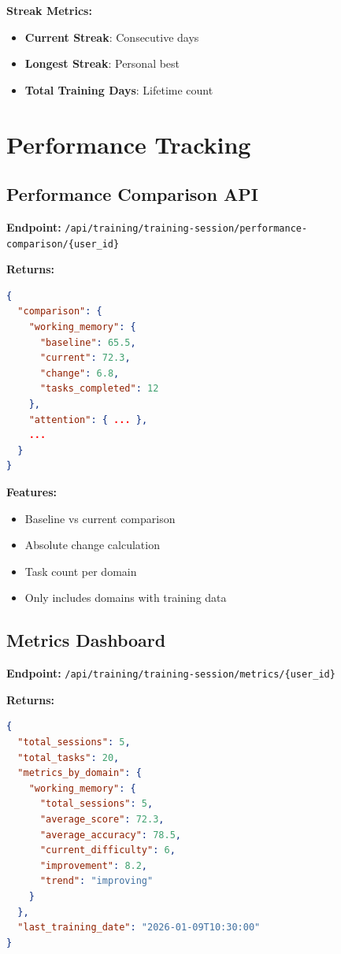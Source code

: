 \documentclass[12pt,a4paper]{article}
\begin{document}
\textbf{Streak Metrics:}
\begin{itemize}
    \item \textbf{Current Streak}: Consecutive days
    \item \textbf{Longest Streak}: Personal best
    \item \textbf{Total Training Days}: Lifetime count
\end{itemize}

\section{Performance Tracking}

\subsection{Performance Comparison API}

\textbf{Endpoint:} \texttt{/api/training/training-session/performance-comparison/\{user\_id\}}

\textbf{Returns:}
\begin{lstlisting}[language=json]
{
  "comparison": {
    "working_memory": {
      "baseline": 65.5,
      "current": 72.3,
      "change": 6.8,
      "tasks_completed": 12
    },
    "attention": { ... },
    ...
  }
}
\end{lstlisting}

\textbf{Features:}
\begin{itemize}
    \item Baseline vs current comparison
    \item Absolute change calculation
    \item Task count per domain
    \item Only includes domains with training data
\end{itemize}

\subsection{Metrics Dashboard}

\textbf{Endpoint:} \texttt{/api/training/training-session/metrics/\{user\_id\}}

\textbf{Returns:}
\begin{lstlisting}[language=json]
{
  "total_sessions": 5,
  "total_tasks": 20,
  "metrics_by_domain": {
    "working_memory": {
      "total_sessions": 5,
      "average_score": 72.3,
      "average_accuracy": 78.5,
      "current_difficulty": 6,
      "improvement": 8.2,
      "trend": "improving"
    }
  },
  "last_training_date": "2026-01-09T10:30:00"
}
\end{lstlisting}
\end{document}
